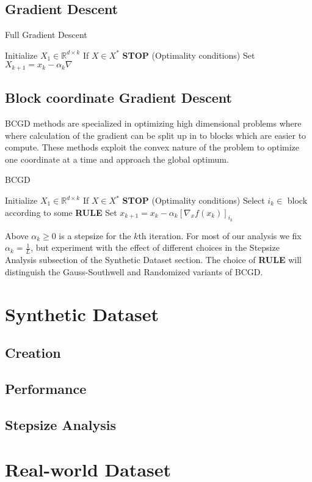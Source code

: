 \documentclass{article}
\begin{document}
\subsection{Gradient Descent}
\begin{algorithm}
\caption{Full Gradient Descent}\label{alg:cap}
\begin{algorithmic}
\State Initialize $X_1 \in \mathbb{R}^{d\times k}$
    \State If $X \in X^*$ \textbf{STOP} (Optimality conditions)
    \State Set $X_{k+1} = x_k - \alpha_{k}\nabla$
\EndFor
\end{algorithmic}
\end{algorithm}

\subsection{Block coordinate Gradient Descent}
BCGD methods are specialized in optimizing high dimensional problems where where calculation of the gradient can be split up in to blocks which are easier to compute. These methods exploit the convex nature of the problem to optimize one coordinate at a time and approach the global optimum.
\begin{algorithm}
\caption{BCGD}\label{alg:cap}
\begin{algorithmic}
\State Initialize $X_1 \in \mathbb{R}^{d\times k}$
    \State If $X \in X^*$ \textbf{STOP} (Optimality conditions)
    \State Select $i_k \in $ block according to some \textbf{RULE}
    \State Set $x_{k+1} = x_k - \alpha_k[\nabla_x f(x_k)]_{i_k}$
\EndFor
\end{algorithmic}
\end{algorithm}
Above $\alpha_k \geq 0$ is a stepsize for the $k$th iteration. For most of our analysis we fix $\alpha_k = \frac{1}{L}$, but experiment with the effect of different choices in the Stepsize Analysis subsection of the Synthetic Dataset section. The choice of \textbf{RULE} will distinguish the Gauss-Southwell and Randomized variants of BCGD. 

\section{Synthetic Dataset}
\subsection{Creation}
\subsection{Performance}
\subsection{Stepsize Analysis}
\section{Real-world Dataset}
\end{document}
